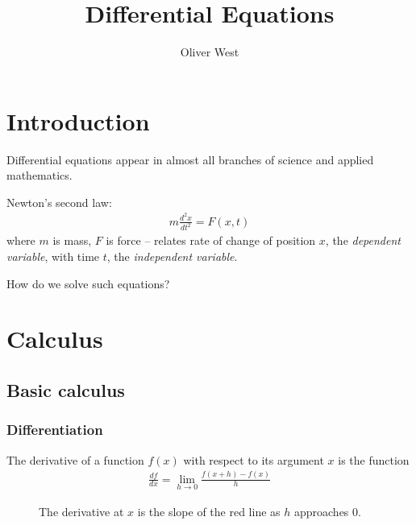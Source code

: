 \documentclass{../template/note}
\author{Oliver West}
\title{Differential Equations}
\date{}
\begin{document}
    \maketitle

    \tableofcontents


    \setcounter{section}{-1}
    \section{Introduction}

    Differential equations appear in almost all branches of science and applied mathematics.

    \begin{example}
        Newton's second law:
        \begin{align*}
            m \frac{d^2x}{dt^2} = F(x,t)
        \end{align*}
        where \(m\) is mass, \(F\) is force -- relates rate of change of position \(x\), the \emph{dependent variable}, with time \(t\), the \emph{independent variable}. 
    \end{example}

    \noindent How do we solve such equations?

    \section{Calculus}

    \subsection{Basic calculus}

    \subsubsection{Differentiation}
    
    \begin{definition}
        The derivative of a function \(f(x)\) with respect to its argument \(x\) is the function
        \begin{align*}
            \frac{df}{dx}=\lim_{h\to 0}\frac{f(x+h)-f(x)}{h}
        \end{align*}

        \begin{figure}[ht]
            \centering
            \caption{The derivative at \(x\) is the slope of the red line as \(h\) approaches 0.}
            \label{fig:derivative-diagram}
        \end{figure}
    
    \end{definition}
\end{document}
